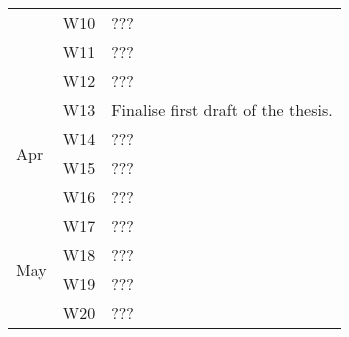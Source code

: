 \documentclass{article}
\begin{document}
\begin{table}[]
\begin{tabular}{lll}
                     & W10  & ??? \\
                     & W11  & ??? \\
                     & W12  & ??? \\ \hline
\multirow{4}{*}{Apr} & W13  & Finalise first draft of the thesis. \\
                     & W14  & ??? \\
                     & W15  & ??? \\
                     & W16  & ??? \\ \hline
\multirow{4}{*}{May} & W17  & ??? \\
                     & W18  & ??? \\
                     & W19  & ??? \\
                     & W20  & ???
\end{tabular}
\end{table}

\newpage


\end{document}
